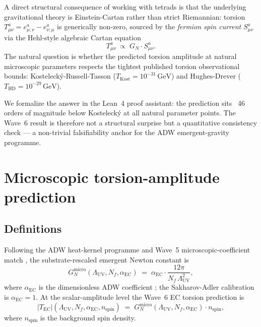 \documentclass[twocolumn]{revtex4-2}
\newcommand{\Nf}{N_f}
\newcommand{\LambdaUV}{\Lambda_{\mathrm{UV}}}
\newcommand{\aEC}{\alpha_{\mathrm{EC}}}
\newcommand{\GN}{G_{N}}
\newcommand{\TEC}{T_{\mathrm{EC}}}
\newcommand{\nspin}{n_{\mathrm{spin}}}
\newcommand{\TKost}{T_{\mathrm{Kost}}}
\newcommand{\THD}{T_{\mathrm{HD}}}
\begin{document}
A direct structural consequence of working with tetrads is that the
underlying gravitational theory is Einstein-Cartan rather than
strict Riemannian: torsion $T^{a}_{\mu\nu} = e^{a}_{\mu;\nu}
- e^{a}_{\nu;\mu}$ is generically non-zero, sourced by the
\emph{fermion spin current} $S^{a}_{\mu\nu}$ via the Hehl-style
algebraic Cartan equation \cite{Hehl1976,Trautman1973}
\begin{equation}
  T^{a}_{\mu\nu} \;\propto\; \GN \cdot S^{a}_{\mu\nu}.
  \label{eq:cartan-algebraic}
\end{equation}
The natural question is whether the predicted torsion amplitude at
natural microscopic parameters respects the tightest published
torsion observational bounds: Kostelecký-Russell-Tasson
\cite{KosteleckyRussellTasson2008}
($\TKost = 10^{-31}\,\mathrm{GeV}$) and Hughes-Drever
\cite{Lammerzahl2001} ($\THD = 10^{-29}\,\mathrm{GeV}$).

We formalize the answer in the Lean~4 proof assistant: the prediction
sits ~46 orders of magnitude below Kostelecký at all natural
parameter points. The Wave~6 result is therefore not a structural
surprise but a quantitative consistency check --- a non-trivial
falsifiability anchor for the ADW emergent-gravity programme.

\section{Microscopic torsion-amplitude prediction}

\subsection{Definitions}

Following the ADW heat-kernel programme \cite{Roehm2026Wave1} and
Wave~5 microscopic-coefficient match \cite{Roehm2026Wave5}, the
substrate-rescaled emergent Newton constant is
\begin{equation}
  \GN^{\mathrm{micro}}(\LambdaUV,\Nf,\aEC)
    \;=\; \aEC \cdot \frac{12\pi}{\Nf\,\LambdaUV^{2}},
  \label{eq:GNmicro}
\end{equation}
where $\aEC$ is the dimensionless ADW coefficient
\cite{Vergeles2025}; the Sakharov-Adler calibration is $\aEC = 1$.
At the scalar-amplitude level the Wave~6 EC torsion prediction is
\begin{equation}
  |\TEC|(\LambdaUV,\Nf,\aEC,\nspin)
    \;=\; \GN^{\mathrm{micro}}(\LambdaUV,\Nf,\aEC)\cdot\nspin,
  \label{eq:TEC}
\end{equation}
where $\nspin$ is the background spin density.
\end{document}

